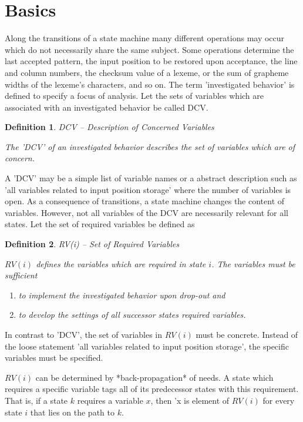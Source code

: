 \documentclass[12pt,a4paper]{scrartcl}
\theoremstyle{break}
\newtheorem{definition}{Definition}
\begin{document}
\section{Basics}

Along the transitions of a state machine many different operations may occur
which do not necessarily share the same subject. Some operations determine the
last accepted pattern, the input position to be restored upon acceptance, the
line and column numbers, the checksum value of a lexeme, or the sum of grapheme
widths of the lexeme's characters, and so on. The term 'investigated behavior'
is defined to specify a focus of analysis.  Let the sets of variables which are
associated with an investigated behavior be called DCV.

\begin{definition}
DCV -- Description of Concerned Variables

The 'DCV' of an investigated behavior describes the set of variables which
are of concern. 
\end{definition}

A 'DCV' may be a simple list of variable names or a abstract description such
as 'all variables related to input position storage' where the number of
variables is open.  As a consequence of transitions, a state machine changes
the content of variables. However, not all variables of the DCV are necessarily
relevant for all states. Let the set of required variables be defined as

\begin{definition}
RV(i) -- Set of Required Variables

$RV(i)$ defines the variables which are required in state $i$. The
variables must be sufficient

\begin{enumerate}
\item  to implement the investigated behavior upon drop-out and
\item to develop the settings of all successor states required variables.
\end{enumerate}
\end{definition}

In contrast to 'DCV', the set of variables in $RV(i)$ must be concrete.
Instead of the loose statement 'all variables related to input position
storage', the specific variables must be specified. 

$RV(i)$ can be determined by *back-propagation* of needs. A state which
requires a specific variable tags all of its predecessor states with this
requirement. That is, if a state $k$ requires a variable $x$, then 'x is
element of $RV(i)$ for every state $i$ that lies on the path to $k$.
\end{document}
